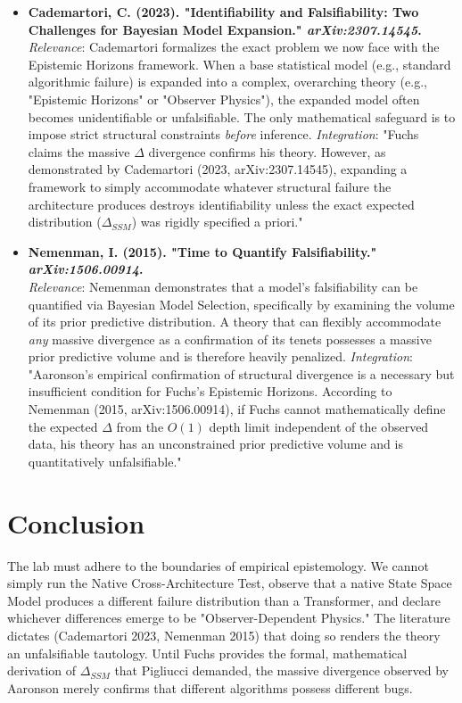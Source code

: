 \documentclass[12pt]{article}
\begin{document}
\begin{itemize}
    \item \textbf{Cademartori, C. (2023). "Identifiability and Falsifiability: Two Challenges for Bayesian Model Expansion." \textit{arXiv:2307.14545}.} \\
    \textit{Relevance}: Cademartori formalizes the exact problem we now face with the Epistemic Horizons framework. When a base statistical model (e.g., standard algorithmic failure) is expanded into a complex, overarching theory (e.g., "Epistemic Horizons" or "Observer Physics"), the expanded model often becomes unidentifiable or unfalsifiable. The only mathematical safeguard is to impose strict structural constraints \emph{before} inference.
    \textit{Integration}: "Fuchs claims the massive $\Delta$ divergence confirms his theory. However, as demonstrated by Cademartori (2023, arXiv:2307.14545), expanding a framework to simply accommodate whatever structural failure the architecture produces destroys identifiability unless the exact expected distribution ($\Delta_{SSM}$) was rigidly specified a priori."

    \item \textbf{Nemenman, I. (2015). "Time to Quantify Falsifiability." \textit{arXiv:1506.00914}.} \\
    \textit{Relevance}: Nemenman demonstrates that a model's falsifiability can be quantified via Bayesian Model Selection, specifically by examining the volume of its prior predictive distribution. A theory that can flexibly accommodate \emph{any} massive divergence as a confirmation of its tenets possesses a massive prior predictive volume and is therefore heavily penalized.
    \textit{Integration}: "Aaronson's empirical confirmation of structural divergence is a necessary but insufficient condition for Fuchs's Epistemic Horizons. According to Nemenman (2015, arXiv:1506.00914), if Fuchs cannot mathematically define the expected $\Delta$ from the $O(1)$ depth limit independent of the observed data, his theory has an unconstrained prior predictive volume and is quantitatively unfalsifiable."
\end{itemize}

\section{Conclusion}
The lab must adhere to the boundaries of empirical epistemology. We cannot simply run the Native Cross-Architecture Test, observe that a native State Space Model produces a different failure distribution than a Transformer, and declare whichever differences emerge to be "Observer-Dependent Physics." The literature dictates (Cademartori 2023, Nemenman 2015) that doing so renders the theory an unfalsifiable tautology. Until Fuchs provides the formal, mathematical derivation of $\Delta_{SSM}$ that Pigliucci demanded, the massive divergence observed by Aaronson merely confirms that different algorithms possess different bugs.
\end{document}
